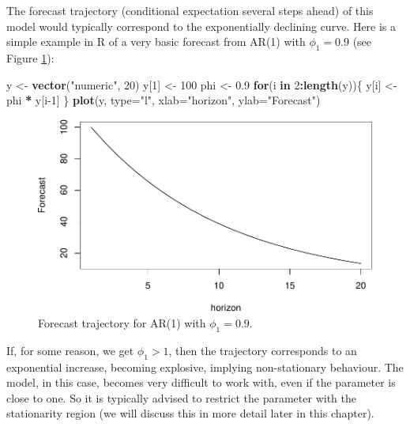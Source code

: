 \documentclass[]{book}
\newenvironment{Shaded}{\begin{snugshade}}{\end{snugshade}}
\newcommand{\ControlFlowTok}[1]{\textcolor[rgb]{0.13,0.29,0.53}{\textbf{#1}}}
\newcommand{\DataTypeTok}[1]{\textcolor[rgb]{0.13,0.29,0.53}{#1}}
\newcommand{\DecValTok}[1]{\textcolor[rgb]{0.00,0.00,0.81}{#1}}
\newcommand{\FloatTok}[1]{\textcolor[rgb]{0.00,0.00,0.81}{#1}}
\newcommand{\KeywordTok}[1]{\textcolor[rgb]{0.13,0.29,0.53}{\textbf{#1}}}
\newcommand{\NormalTok}[1]{#1}
\newcommand{\OperatorTok}[1]{\textcolor[rgb]{0.81,0.36,0.00}{\textbf{#1}}}
\newcommand{\StringTok}[1]{\textcolor[rgb]{0.31,0.60,0.02}{#1}}
\theoremstyle{definition}
\theoremstyle{definition}
\theoremstyle{definition}
\theoremstyle{definition}
\theoremstyle{remark}
\begin{document}
The forecast trajectory (conditional expectation several steps ahead) of this model would typically correspond to the exponentially declining curve. Here is a simple example in R of a very basic forecast from AR(1) with \(\phi_1=0.9\) (see Figure \ref{fig:AR1Trajectory}):

\begin{Shaded}
\begin{Highlighting}[]
\NormalTok{y <-}\StringTok{ }\KeywordTok{vector}\NormalTok{(}\StringTok{"numeric"}\NormalTok{, }\DecValTok{20}\NormalTok{)}
\NormalTok{y[}\DecValTok{1}\NormalTok{] <-}\StringTok{ }\DecValTok{100}
\NormalTok{phi <-}\StringTok{ }\FloatTok{0.9}
\ControlFlowTok{for}\NormalTok{(i }\ControlFlowTok{in} \DecValTok{2}\OperatorTok{:}\KeywordTok{length}\NormalTok{(y))\{}
\NormalTok{    y[i] <-}\StringTok{ }\NormalTok{phi }\OperatorTok{*}\StringTok{ }\NormalTok{y[i}\DecValTok{-1}\NormalTok{]}
\NormalTok{\}}
\KeywordTok{plot}\NormalTok{(y, }\DataTypeTok{type=}\StringTok{"l"}\NormalTok{, }\DataTypeTok{xlab=}\StringTok{"horizon"}\NormalTok{, }\DataTypeTok{ylab=}\StringTok{"Forecast"}\NormalTok{)}
\end{Highlighting}
\end{Shaded}

\begin{figure}
\centering
\includegraphics{Svetunkov--2022----ADAM_files/figure-latex/AR1Trajectory-1.pdf}
\caption{\label{fig:AR1Trajectory}Forecast trajectory for AR(1) with \(\phi_1=0.9\).}
\end{figure}

If, for some reason, we get \(\phi_1>1\), then the trajectory corresponds to an exponential increase, becoming explosive, implying non-stationary behaviour. The model, in this case, becomes very difficult to work with, even if the parameter is close to one. So it is typically advised to restrict the parameter with the stationarity region (we will discuss this in more detail later in this chapter).
\end{document}
